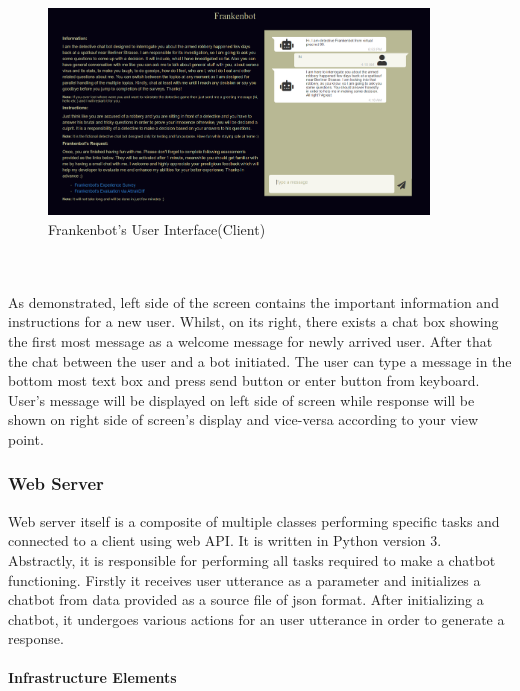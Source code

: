 \begin{figure}[!h]
    \centering
    \includegraphics[width=0.9\textwidth]{img/User_Interface.PNG}
    \caption{Frankenbot's User Interface(Client)}
    \label{fig:userInter}
\end{figure}
\\~\\
As demonstrated, left side of the screen contains the important information and instructions for a new user. Whilst, on its right, there exists a chat box showing the first most message as a welcome message for newly arrived user. After that the chat between the user and a bot initiated. The user can type a message in the bottom most text box and press send button or enter button from keyboard. User's message will be displayed on left side of screen while response will be shown on right side of screen's display and vice-versa according to your view point.

\subsubsection*{Web Server}
Web server itself is a composite of multiple classes performing specific tasks and connected to a client using web API. It is written in Python version 3. Abstractly, it is responsible for performing all tasks required to make a chatbot functioning. Firstly it receives user utterance as a parameter and initializes a chatbot from data provided as a source file of json format. After initializing a chatbot, it undergoes various actions for an user utterance in order to generate a response.

\paragraph*{Infrastructure Elements}

